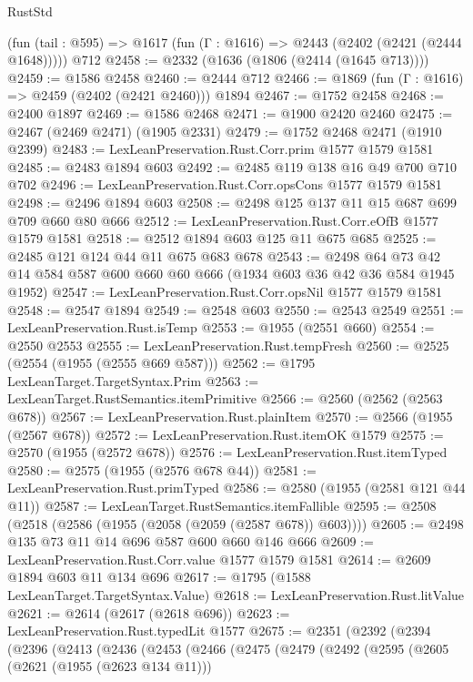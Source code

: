 \begin{lexlean}{RustStd}
\begin{coremodule}
    (fun (tail : @595) => @1617 (fun (Γ : @1616) => @2443 (@2402 (@2421 (@2444 @1648)))))
    @712
@2458 := @2332 (@1636 (@1806 (@2414 (@1645 @713))))
@2459 := @1586 @2458
@2460 := @2444 @712
@2466 := @1869 (fun (Γ : @1616) => @2459 (@2402 (@2421 @2460))) @1894
@2467 := @1752 @2458
@2468 := @2400 @1897
@2469 := @1586 @2468
@2471 := @1900 @2420 @2460
@2475 := @2467 (@2469 @2471) (@1905 @2331)
@2479 := @1752 @2468 @2471 (@1910 @2399)
@2483 := LexLeanPreservation.Rust.Corr.prim @1577 @1579 @1581
@2485 := @2483 @1894 @603
@2492 := @2485 @119 @138 @16 @49 @700 @710 @702
@2496 := LexLeanPreservation.Rust.Corr.opsCons @1577 @1579 @1581
@2498 := @2496 @1894 @603
@2508 := @2498 @125 @137 @11 @15 @687 @699 @709 @660 @80 @666
@2512 := LexLeanPreservation.Rust.Corr.eOfB @1577 @1579 @1581
@2518 := @2512 @1894 @603 @125 @11 @675 @685
@2525 := @2485 @121 @124 @44 @11 @675 @683 @678
@2543 := @2498
    @64
    @73
    @42
    @14
    @584
    @587
    @600
    @660
    @60
    @666
    (@1934 @603 @36 @42 @36 @584 @1945 @1952)
@2547 := LexLeanPreservation.Rust.Corr.opsNil @1577 @1579 @1581
@2548 := @2547 @1894
@2549 := @2548 @603
@2550 := @2543 @2549
@2551 := LexLeanPreservation.Rust.isTemp
@2553 := @1955 (@2551 @660)
@2554 := @2550 @2553
@2555 := LexLeanPreservation.Rust.tempFresh
@2560 := @2525 (@2554 (@1955 (@2555 @669 @587)))
@2562 := @1795 LexLeanTarget.TargetSyntax.Prim
@2563 := LexLeanTarget.RustSemantics.itemPrimitive
@2566 := @2560 (@2562 (@2563 @678))
@2567 := LexLeanPreservation.Rust.plainItem
@2570 := @2566 (@1955 (@2567 @678))
@2572 := LexLeanPreservation.Rust.itemOK @1579
@2575 := @2570 (@1955 (@2572 @678))
@2576 := LexLeanPreservation.Rust.itemTyped
@2580 := @2575 (@1955 (@2576 @678 @44))
@2581 := LexLeanPreservation.Rust.primTyped
@2586 := @2580 (@1955 (@2581 @121 @44 @11))
@2587 := LexLeanTarget.RustSemantics.itemFallible
@2595 := @2508 (@2518 (@2586 (@1955 (@2058 (@2059 (@2587 @678)) @603))))
@2605 := @2498 @135 @73 @11 @14 @696 @587 @600 @660 @146 @666
@2609 := LexLeanPreservation.Rust.Corr.value @1577 @1579 @1581
@2614 := @2609 @1894 @603 @11 @134 @696
@2617 := @1795 (@1588 LexLeanTarget.TargetSyntax.Value)
@2618 := LexLeanPreservation.Rust.litValue
@2621 := @2614 (@2617 (@2618 @696))
@2623 := LexLeanPreservation.Rust.typedLit @1577
@2675 := @2351
    (@2392
      (@2394
        (@2396
          (@2413
            (@2436
              (@2453
                (@2466
                  (@2475
                    (@2479
                      (@2492
                        (@2595
                          (@2605
                            (@2621 (@1955 (@2623 @134 @11)))

\end{coremodule}
\end{lexlean}
